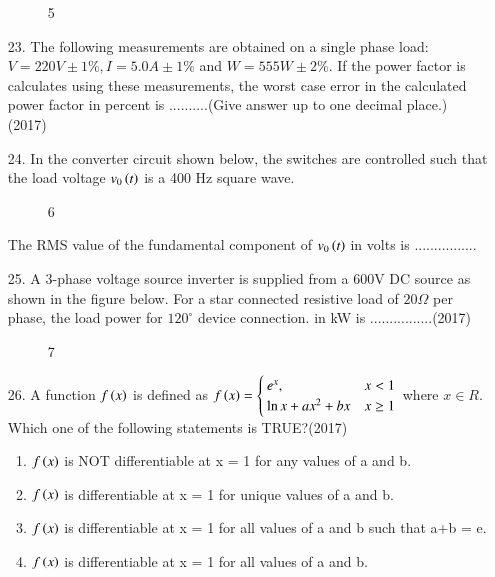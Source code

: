 \documentclass[journal]{IEEEtran}
\begin{document}
\begin{enumerate}
\begin{figure}[!ht]
        \centering
        \caption{5}
    \end{figure}
    \item[23.] The following measurements are obtained on a single phase load: $V = 220 V\pm 1\%, I = 5.0A\pm 1\%$ and $W = 555W \pm 2\%$. If the power factor is calculates using these measurements, the worst case error in the calculated power factor in percent is ..........(Give answer up to one decimal place.) \hfill (2017)
    \item[24.] In the converter circuit shown below, the switches are controlled such that the load voltage $v_0\left(t\right)$ is a 400 Hz square wave.
    \begin{figure}[!ht]
        \centering
        \caption{6}
    \end{figure}
    The RMS value of the fundamental component of $v_0\left(t\right)$ in volts is ................
    \item[25.] A 3-phase voltage source inverter is supplied from a 600V DC source as shown in the figure below. For a star connected resistive load of $20\Omega$ per phase, the load power for $120^{\circ}$ device connection. in kW is ................\hfill (2017)
    \begin{figure}[!ht]
        \centering
        \caption{7}
    \end{figure}
    \item[26.] A function $f\left(x\right)$ is defined as $f\left(x\right) = \begin{cases}e^x, & x<1\\ \ln x+ax^2+bx &x\geq 1\end{cases}$ where $x \in R$. Which one of the following statements is TRUE?\hfill (2017)
    \begin{enumerate}[label = (\Alph*)]
        \item $f\left(x\right)$ is NOT differentiable at x = 1 for any values of a and b.
        \item $f\left(x\right)$ is differentiable at x = 1 for unique values of a and b.
        \item $f\left(x\right)$ is differentiable at x = 1 for all values of a and b such that a+b = e.
        \item $f\left(x\right)$ is differentiable at x = 1 for all values of a and b.
    \end{enumerate}
\end{enumerate}
\end{document}

